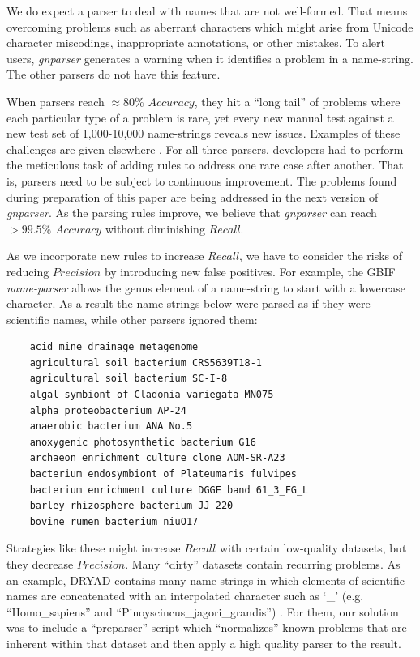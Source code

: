 \documentclass{bmcart}
\begin{document}
\vspace{0.5cm}

We do expect a parser to deal with names that are not well-formed. That means overcoming problems such as aberrant characters which might arise from Unicode character miscodings, inappropriate annotations, or other mistakes. To alert users,
\textit{gnparser} generates a warning when it identifies a problem in a name-string. The other parsers do not have this feature.

When parsers reach $\approx80\%$ $Accuracy$, they hit a ``long tail'' of
problems where each particular type of a problem is rare, yet every new manual
test against a new test set of 1,000-10,000 name-strings reveals new issues.  Examples of these
challenges are given elsewhere \cite{Patterson:inpress-a}. For all three
parsers, developers had to perform the meticulous task of adding rules to address one rare case after
another. That is, parsers need to be subject to continuous improvement. The problems found
during preparation of this paper are being addressed in the next version of
\textit{gnparser}. As the parsing rules improve, we believe that
\textit{gnparser} can reach $>99.5\%$ $Accuracy$ without diminishing $Recall$.

As we incorporate new rules to increase $Recall$, we have to consider the risks
of reducing $Precision$ by introducing new false positives. For example, the GBIF
\textit{name-parser} allows the genus element of a name-string to start with a
lowercase character. As a result the name-strings below were parsed as if they
were scientific names, while other parsers ignored them:

\vspace{0.5cm}

\begin{verbatim}
    acid mine drainage metagenome
    agricultural soil bacterium CRS5639T18-1
    agricultural soil bacterium SC-I-8
    algal symbiont of Cladonia variegata MN075
    alpha proteobacterium AP-24
    anaerobic bacterium ANA No.5
    anoxygenic photosynthetic bacterium G16
    archaeon enrichment culture clone AOM-SR-A23
    bacterium endosymbiont of Plateumaris fulvipes
    bacterium enrichment culture DGGE band 61_3_FG_L
    barley rhizosphere bacterium JJ-220
    bovine rumen bacterium niuO17
\end{verbatim}

\vspace{0.5cm}

Strategies like these might increase $Recall$ with certain low-quality datasets,
but they decrease $Precision$. Many
``dirty'' datasets contain recurring problems. As an example, DRYAD contains many name-strings in which elements of scientific names are concatenated with an interpolated character such as `\_’ (e.g. ``Homo\_sapiens'' and ``Pinoyscincus\_jagori\_grandis'') \cite{Patterson:inpress-a}. For them, our solution
was to include a ``preparser'' script which ``normalizes'' known problems that are inherent within that dataset and
then apply a high quality parser to the result.  
\end{document}
